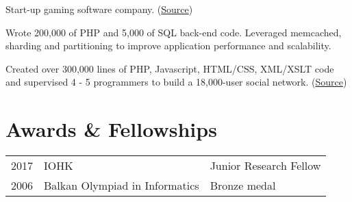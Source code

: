 \documentclass[]{deedy-resume-openfont}
\begin{document}
\begin{minipage}[t]{0.66\textwidth}
Start-up gaming software company.
(\href{https://github.com/kamibu/finalengine}{Source})
\sectionsep

Wrote 200,000 of PHP and 5,000 of SQL back-end code.
Leveraged memcached, sharding and partitioning to improve application performance and scalability.
\sectionsep

Created over 300,000 lines of PHP, Javascript, HTML/CSS, XML/XSLT code and supervised 4 - 5 programmers to build a 18,000-user social network. (\href{https://github.com/dionyziz/zino}{Source})
\sectionsep



\section{Awards \& Fellowships}

\begin{tabular}{rll}
2017   & IOHK & Junior Research Fellow\\
2006   & Balkan Olympiad in Informatics & Bronze medal\\
\end{tabular}
\sectionsep

\end{minipage}
\end{document}
